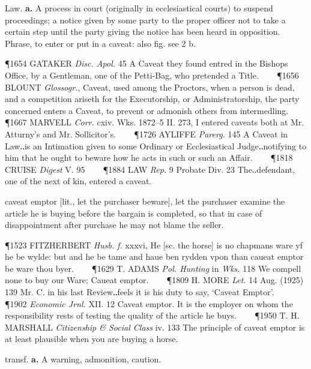 \begin{description}[wide, labelwidth=!, labelindent=0pt]
\vspace{-0.3cm}

\begin{myenumerate}

 Law. \textbf{a.} A process in court (originally in ecclesiastical courts) to suspend proceedings; a notice given by some party to the proper officer not to take a certain step until the party giving the notice has been heard in opposition. Phrase, to enter or put in a caveat: also fig. see 2 b.

\P 1654 GATAKER  \textit{Disc. Apol.} 45 A Caveat they found entred in the Bishops Office, by a Gentleman, one of the Petti-Bag, who pretended a Title.    
\P 1656 BLOUNT  \textit{Glossogr.}, Caveat, used among the Proctors, when a person is dead, and a competition ariseth for the Executorship, or Administratorship, the party concerned enters a Caveat, to prevent or admonish others from intermedling.    
\P 1667 MARVELL  \textit{Corr.} cxiv. Wks. 1872–5 II. 273, I entered caveats both at Mr. Atturny's and Mr. Sollicitor's.    
\P 1726 AYLIFFE  \textit{Parerg.} 145 A Caveat in Law‥is an Intimation given to some Ordinary or Ecclesiastical Judge‥notifying to him that he ought to beware how he acts in such or such an Affair.    
\P 1818 CRUISE  \textit{Digest} V. 95    
\P 1884 LAW  \textit{Rep.} 9 Probate Div. 23 The‥defendant, one of the next of kin, entered a caveat.

 caveat emptor [lit., let the purchaser beware], let the purchaser examine the article he is buying before the bargain is completed, so that in case of disappointment after purchase he may not blame the seller.

\P 1523 FITZHERBERT  \textit{Husb. f.} xxxvi, He [sc. the horse] is no chapmans ware yf he be wylde: but and he be tame and haue ben rydden vpon than caueat emptor be ware thou byer.    
\P 1629 T. ADAMS  \textit{Pol. Hunting} in \textit{Wks.} 118 We compell none to buy our Ware; Caueat emptor.    
\P 1809 H. MORE  \textit{Let.} 14 Aug. (1925) 139 Mr. C. in his last Review‥feels it is his duty to say, ‘Caveat Emptor’.    
\P 1902  \textit{Economic Jrnl.} XII. 12 Caveat emptor. It is the employer on whom the responsibility rests of testing the quality of the article he buys.    
\P 1950 T. H. MARSHALL  \textit{Citizenship \& Social Class} iv. 133 The principle of caveat emptor is at least plausible when you are buying a horse.

 transf. \textbf{a.} A warning, admonition, caution.


\end{myenumerate}
\end{description}
